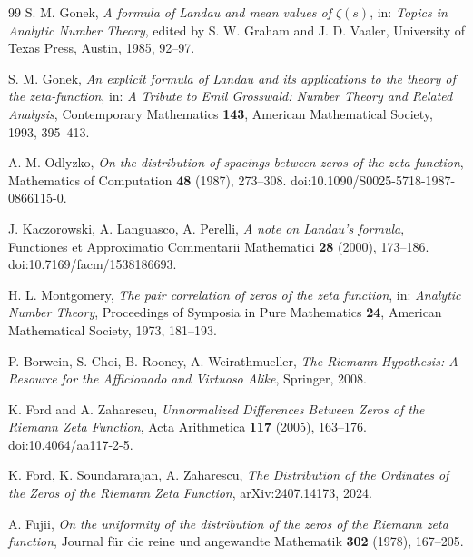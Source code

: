 \documentclass[11pt]{amsart}
\numberwithin{equation}{section}
\theoremstyle{plain}
\theoremstyle{definition}
\theoremstyle{remark}
\begin{document}
\begin{thebibliography}{99}
S. M. Gonek,
\emph{A formula of Landau and mean values of \(\zeta(s)\)},
in:
\emph{Topics in Analytic Number Theory},
edited by S. W. Graham and J. D. Vaaler,
University of Texas Press,
Austin,
1985,
92--97.

S. M. Gonek,
\emph{An explicit formula of Landau and its applications to the theory of the zeta-function},
in:
\emph{A Tribute to Emil Grosswald:
Number Theory and Related Analysis},
Contemporary Mathematics
\textbf{143},
American Mathematical Society,
1993,
395--413.

A. M. Odlyzko,
\emph{On the distribution of spacings between zeros of the zeta function},
Mathematics of Computation
\textbf{48} (1987),
273--308.
doi:10.1090/S0025-5718-1987-0866115-0.

J. Kaczorowski,
A. Languasco,
A. Perelli,
\emph{A note on Landau's formula},
Functiones et Approximatio Commentarii Mathematici
\textbf{28} (2000),
173--186.
doi:10.7169/facm/1538186693.

H. L. Montgomery,
\emph{The pair correlation of zeros of the zeta function},
in:
\emph{Analytic Number Theory},
Proceedings of Symposia in Pure Mathematics
\textbf{24},
American Mathematical Society,
1973,
181--193.

P. Borwein,
S. Choi,
B. Rooney,
A. Weirathmueller,
\emph{The Riemann Hypothesis:
A Resource for the Afficionado and Virtuoso Alike},
Springer,
2008.

K. Ford and A. Zaharescu,
\emph{Unnormalized Differences Between Zeros of the Riemann Zeta Function},
Acta Arithmetica
\textbf{117} (2005),
163--176.
doi:10.4064/aa117-2-5.

K. Ford,
K. Soundararajan,
A. Zaharescu,
\emph{The Distribution of the Ordinates of the Zeros of the Riemann Zeta Function},
arXiv:2407.14173,
2024.

A. Fujii,
\emph{On the uniformity of the distribution of the zeros of the
Riemann zeta function},
Journal f\"ur die reine und angewandte Mathematik
\textbf{302} (1978),
167--205.

\end{thebibliography}
\end{document}
